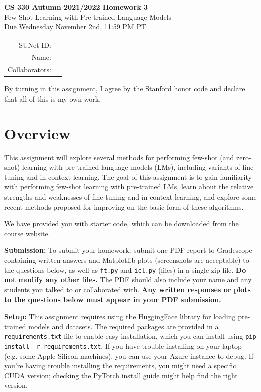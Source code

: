 \documentclass[12pt]{article}
\begin{document}
\begin{center}
{\Large \textbf{CS 330 Autumn 2021/2022 Homework 3} \\ Few-Shot Learning with Pre-trained Language Models
\\ 
\vspace{0.2cm}
Due Wednesday November 2nd, 11:59 PM PT}

\begin{tabular}{rl}
SUNet ID: &  \\
Name: & \\
Collaborators: & 
\end{tabular}
\end{center}

By turning in this assignment, I agree by the Stanford honor code and declare that all of this is my own work.

\section*{Overview}
This assignment will explore several methods for performing few-shot (and zero-shot) learning with pre-trained language models (LMs), including variants of fine-tuning and in-context learning. The goal of this assignment is to gain familiarity with performing few-shot learning with pre-trained LMs, learn about the relative strengths and weaknesses of fine-tuning and in-context learning, and explore some recent methods proposed for improving on the basic form of these algorithms.

\noindent We have provided you with starter code, which can be downloaded from the course website.

\textbf{Submission:} To submit your homework, submit one PDF report to Gradescope containing written answers and Matplotlib plots (screenshots are acceptable) to the questions below, as well as \texttt{ft.py} and \texttt{icl.py} (files) in a single zip file. \textbf{Do not modify any other files.} The PDF should also include your name and any students you talked to or collaborated with. \textbf{Any written responses or plots to the questions below must appear in your PDF submission.}

\textbf{Setup:} This assignment requires using the HuggingFace library for loading pre-trained models and datasets. The required packages are provided in a \texttt{requirements.txt} file to enable easy installation, which you can install using \texttt{pip install -r requirements.txt}. If you have trouble installing on your laptop (e.g. some Apple Silicon machines), you can use your Azure instance to debug. If you're having trouble installing the requirements, you might need a specific CUDA version; checking the \href{https://pytorch.org/get-started/locally/}{PyTorch install guide} might help find the right version.
\end{document}
